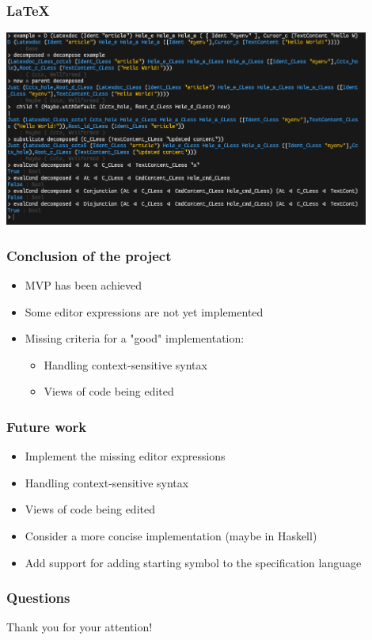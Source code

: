 \documentclass[t,24pt,aspectratio=169]{beamer}
\begin{document}
\begin{frame}[hvid]
    \frametitle{\LaTeX}
    \includegraphics[width=0.9\textwidth]{img/latex-repl.png}
\end{frame}


\begin{frame}[hvid]
    \frametitle{Conclusion of the project}
    \begin{itemize}
        \item<1-> MVP has been achieved
        \item<2-> Some editor expressions are not yet implemented
        \item<3-> Missing criteria for a "good" implementation:
              \begin{itemize}
                  \item Handling context-sensitive syntax
                  \item Views of code being edited
              \end{itemize}
    \end{itemize}
\end{frame}


\begin{frame}[hvid]
    \frametitle{Future work}

    \begin{itemize}
        \item Implement the missing editor expressions
        \item Handling context-sensitive syntax
        \item Views of code being edited
        \item Consider a more concise implementation (maybe in Haskell)
        \item Add support for adding starting symbol to the specification language
    \end{itemize}
\end{frame}



\begin{frame}[hvid]
    \frametitle{Questions}
    \centering
    \large{Thank you for your attention!}
\end{frame}
\end{document}
